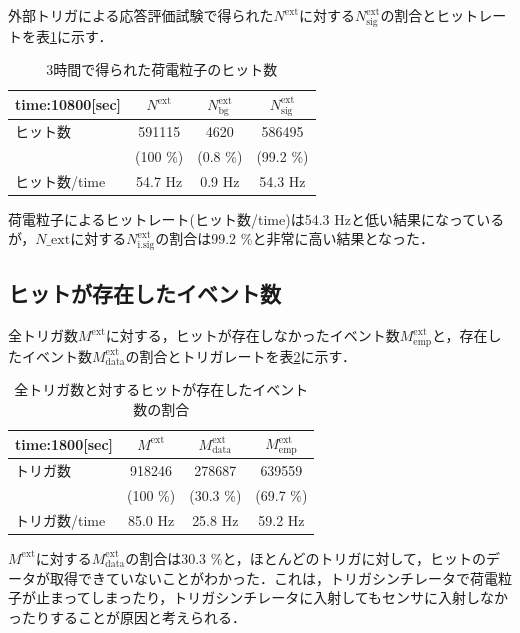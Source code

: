 外部トリガによる応答評価試験で得られた$N^{\mathrm{ext}}$に対する$N_{\mathrm{sig}}^{\mathrm{ext}}$の割合とヒットレートを表\ref{tab:extp}に示す．
\begin{table}[h]
  \centering
  \caption{3時間で得られた荷電粒子のヒット数}
  \begin{tabular} {l|ccc} \hline
    time:10800[sec]& $N^{\mathrm{ext}}$ & $N_{\mathrm{bg}}^{\mathrm{ext}}$ & $N_{\mathrm{sig}}^{\mathrm{ext}}$ \\ \hline
    ヒット数 & 591115 & 4620 & 586495 \\
    & (100 \%) & (0.8 \%) & (99.2 \%) \\ \hline
    ヒット数/time & 54.7 $\mathrm{Hz}$ & 0.9 $\mathrm{Hz}$ & 54.3 $\mathrm{Hz}$ \\ \hline
  \end{tabular}
  \label{tab:extp}
\end{table}

荷電粒子によるヒットレート(ヒット数/time)は54.3 $\mathrm{Hz}$と低い結果になっているが，$N\_{\mathrm{ext}}$に対する$N_{\mathrm{i.sig}}^{\mathrm{ext}}$の割合は99.2 \%と非常に高い結果となった．

\subsection*{ヒットが存在したイベント数}
全トリガ数$M^{\mathrm{ext}}$に対する，ヒットが存在しなかったイベント数$M_{\mathrm{emp}}^{\mathrm{ext}}$と，存在したイベント数$M_{\mathrm{data}}^{\mathrm{ext}}$の割合とトリガレートを表\ref{tab:extr}に示す．

\begin{table}[h]
  \centering
  \caption{全トリガ数と対するヒットが存在したイベント数の割合}
  \begin{tabular} {l|ccc} \hline
    time:1800[sec] & $M^{\mathrm{ext}}$ & $M_{\mathrm{data}}^{\mathrm{ext}}$ & $M_{\mathrm{emp}}^{\mathrm{ext}}$ \\ \hline \hline
    トリガ数 & 918246 & 278687 & 639559 \\
     & (100 \%) & (30.3 \%) & (69.7 \%) \\ \hline
    トリガ数/time & 85.0 $\mathrm{Hz}$ & 25.8 $\mathrm{Hz}$ & 59.2 $\mathrm{Hz}$ \\ \hline
  \end{tabular}
  \label{tab:extr}
\end{table}

$M^{\mathrm{ext}}$に対する$M_{\mathrm{data}}^{\mathrm{ext}}$の割合は30.3 \%と，ほとんどのトリガに対して，ヒットのデータが取得できていないことがわかった．これは，トリガシンチレータで荷電粒子が止まってしまったり，トリガシンチレータに入射してもセンサに入射しなかったりすることが原因と考えられる．

